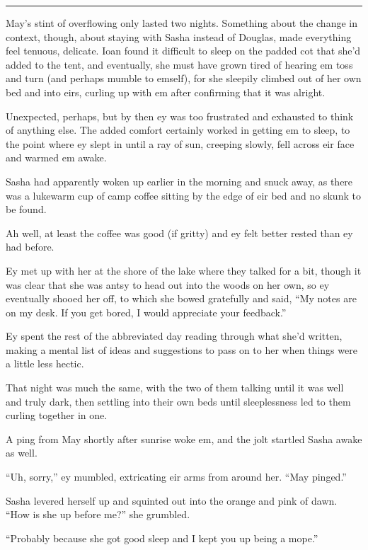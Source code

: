 \begin{center}\rule{0.5\linewidth}{0.5pt}\end{center}

May's stint of overflowing only lasted two nights. Something about the change in context, though, about staying with Sasha instead of Douglas, made everything feel tenuous, delicate. Ioan found it difficult to sleep on the padded cot that she'd added to the tent, and eventually, she must have grown tired of hearing em toss and turn (and perhaps mumble to emself), for she sleepily climbed out of her own bed and into eirs, curling up with em after confirming that it was alright.

Unexpected, perhaps, but by then ey was too frustrated and exhausted to think of anything else. The added comfort certainly worked in getting em to sleep, to the point where ey slept in until a ray of sun, creeping slowly, fell across eir face and warmed em awake.

Sasha had apparently woken up earlier in the morning and snuck away, as there was a lukewarm cup of camp coffee sitting by the edge of eir bed and no skunk to be found.

Ah well, at least the coffee was good (if gritty) and ey felt better rested than ey had before.

Ey met up with her at the shore of the lake where they talked for a bit, though it was clear that she was antsy to head out into the woods on her own, so ey eventually shooed her off, to which she bowed gratefully and said, ``My notes are on my desk. If you get bored, I would appreciate your feedback.''

Ey spent the rest of the abbreviated day reading through what she'd written, making a mental list of ideas and suggestions to pass on to her when things were a little less hectic.

That night was much the same, with the two of them talking until it was well and truly dark, then settling into their own beds until sleeplessness led to them curling together in one.

A ping from May shortly after sunrise woke em, and the jolt startled Sasha awake as well.

``Uh, sorry,'' ey mumbled, extricating eir arms from around her. ``May pinged.''

Sasha levered herself up and squinted out into the orange and pink of dawn. ``How is she up before me?'' she grumbled.

``Probably because she got good sleep and I kept you up being a mope.''

